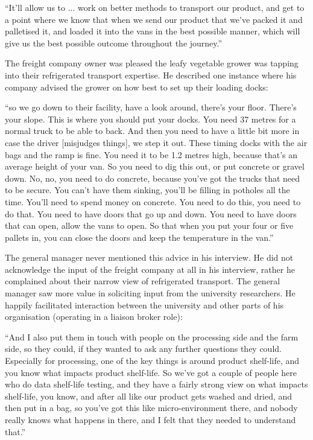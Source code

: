 \begin{displayquote}[Participant 1/1]
\small
\enquote{It'll allow us to ... work on better methods to transport our product, and get to a point where we know that when we send our product that we've packed it and palletised it, and loaded it into the vans in the best possible manner, which will give us the best possible outcome throughout the journey.} 
\end{displayquote}
 

The freight company owner was pleased the leafy vegetable grower was tapping into their refrigerated transport expertise. He described one instance where his company advised the grower on how best to set up their loading docks: 

\begin{displayquote}[Participant 8/1]
\small
\enquote{so we go down to their facility, have a look around, there's your floor. There's your slope. This is where you should put your docks. You need 37 metres for a normal truck to be able to back. And then you need to have a little bit more in case the driver [misjudges things], we step it out. These timing docks with the air bags and the ramp is fine. You need it to be 1.2 metres high, because that’s an average height of your van. So you need to dig this out, or put concrete or gravel down. No, no, you need to do concrete, because you've got the trucks that need to be secure. You can't have them sinking, you'll be filling in potholes all the time. You'll need to spend money on concrete. You need to do this, you need to do that. You need to have doors that go up and down. You need to have doors that can open, allow the vans to open. So that when you put your four or five pallets in, you can close the doors and keep the temperature in the van.} 
\end{displayquote}
 

The general manager never mentioned this advice in his interview. He did not acknowledge the input of the freight company at all in his interview, rather he complained about their narrow view of refrigerated transport. The general manager saw more value in soliciting input from the university researchers. He happily facilitated interaction between the university and other parts of his organisation (operating in a liaison broker role):

\begin{displayquote}[Participant 1/1]
\small
\enquote{And I also put them in touch with people on the processing side and the farm side, so they could, if they wanted to ask any further questions they could. Especially for processing, one of the key things is around product shelf-life, and you know what impacts product shelf-life. So we've got a couple of people here who do data shelf-life testing, and they have a fairly strong view on what impacts shelf-life, you know, and after all like our product gets washed and dried, and then put in a bag, so you've got this like micro-environment there, and nobody really knows what happens in there, and I felt that they needed to understand that.} 
\end{displayquote}
 

